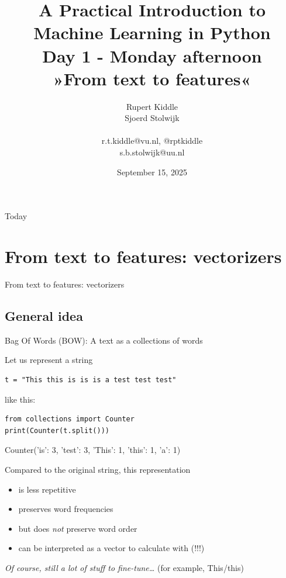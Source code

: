 \documentclass[compress]{beamer}
\title[Big Data and Automated Content Analysis]{\textbf{A Practical Introduction to Machine Learning in Python} \\Day 1 - Monday  afternoon \\ »From text to features«}
\author[Rupert Kiddle, Sjoerd Stolwijk]{Rupert Kiddle \\ Sjoerd Stolwijk \\ ~ \\ \footnotesize{r.t.kiddle@vu.nl, @rptkiddle \\ s.b.stolwijk@uu.nl} \\}
\date{September 15, 2025}
\institute[Gesis]{Gesis}
\begin{document}
	
	\begin{frame}{}
	\titlepage
\end{frame}

\begin{frame}{Today}
\tableofcontents
\end{frame}


\section{From text to features: vectorizers}
\begin{frame}[plain]
From text to features: vectorizers
\end{frame}	



\subsection{General idea}

\begin{frame}[fragile]{Bag Of Words (BOW): A text as a collections of words}

Let us represent a string 
\begin{lstlisting}
t = "This this is is is a test test test"
\end{lstlisting}
like this:\\
\begin{lstlisting}
from collections import Counter
print(Counter(t.split()))
\end{lstlisting}
\begin{lstlistingoutput}
Counter({'is': 3, 'test': 3, 'This': 1, 'this': 1, 'a': 1})
\end{lstlistingoutput}

\pause 
Compared to the original string, this representation
\begin{itemize}
	\item is less repetitive
	\item preserves word frequencies
	\item but does \emph{not} preserve word order
	\item can be interpreted as a vector to calculate with (!!!)
\end{itemize}

\tiny{\emph{Of course, still a lot of stuff to fine-tune\ldots}  (for example, This/this)}
\end{frame}
\end{document}
